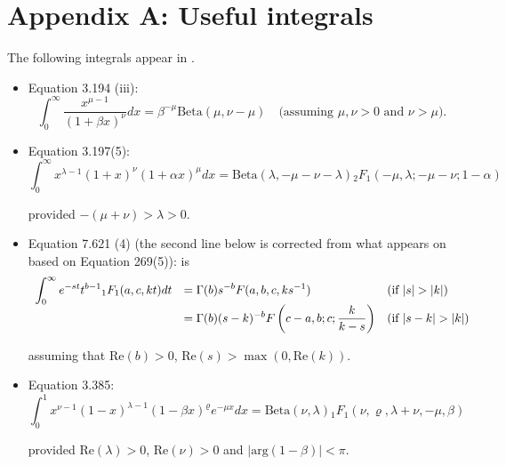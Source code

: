 \documentclass{article}[12pt]
\begin{document}
\newpage 





\newpage 

\section*{Appendix A: Useful integrals}

The following integrals appear in \cite{Gradshteyn2007}.
\begin{itemize}
\item 
Equation 3.194 (iii):
$$
\int_0^\infty \frac{ x^{\mu - 1} }{(1 + \beta x)^\nu} dx = \beta^{-\mu} \mbox{Beta}(\mu,\nu - \mu) \quad   \mbox{(assuming $\mu,\nu>0$ and $\nu>\mu$).}
$$

 




\item  Equation 3.197(5):
$$
\int_0^\infty x^{\lambda - 1}(1 + x)^\nu (1 + \alpha x)^\mu dx
=\mbox{Beta}(\lambda,-\mu-\nu-\lambda){}_2F_1(-\mu,\lambda;-\mu-\nu; 1 - \alpha)
$$

\noindent provided $-(\mu  + \nu) > \lambda > 0$.
 

\item Equation 7.621 (4) 
(the second line below is corrected from what appears on \cite{Gradshteyn2007} based on 
\cite{Erdelyi1953} Equation 269(5)):
is
$$
\begin{array}{rll}
\displaystyle \int_0^\infty e^{-st} t^{b-1} {}_1F_1(a,c,kt) dt
& \displaystyle = \Gamma(b)s^{-b} F(a,b,c,k s^{-1}) 
& \mbox{(if $|s| > |k|$)}
\\
& \displaystyle = \Gamma(b)(s - k)^{-b} F\left(c - a, b; c; \frac{k}{k - s} \right)
& \mbox{(if $|s - k| > |k|$)}
\end{array} 
$$

\noindent assuming that $\mbox{Re}(b)>0$, $\mbox{Re}(s) > \max(0,\mbox{Re}(k))$.

\item Equation 3.385:
\begin{equation} \label{res:04}
\int_{0}^1 x^{\nu - 1} (1 - x)^{\lambda - 1}(1 - \beta x)^{\varrho} e^{-\mu x} dx 
= \mbox{Beta}(\nu,\lambda) {}_1 F_1(\nu,\varrho,\lambda+\nu,-\mu,\beta)
\end{equation}

\noindent provided $\mbox{Re}(\lambda)>0$, $\mbox{Re}(\nu)>0$ and $|\mbox{arg}(1-\beta)|<\pi$.





 

\end{itemize}
\end{document}
